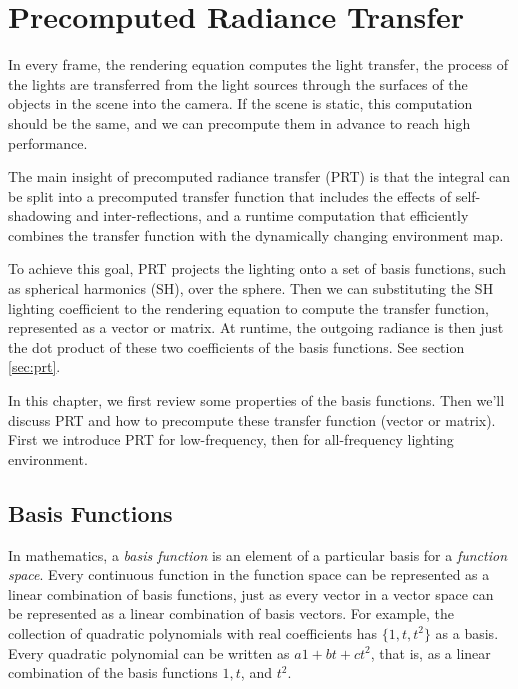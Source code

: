 \chapter{Precomputed Radiance Transfer}\label{chp:prt}
In every frame, the rendering equation computes the light transfer, the process of the lights are transferred from the light sources through the surfaces of the objects in the scene into the camera. If the scene is static, this computation should be the same, and we can precompute them in advance to reach high performance.

The main insight of precomputed radiance transfer (PRT)\cite{a:PrecomputedRadianceTransferforRealTimeRenderinginDynamicLowFrequencyLightingEnvironments} is that the integral can be split into a precomputed transfer function that includes the effects of self-shadowing and inter-reflections, and a runtime computation that efficiently combines the transfer function with the dynamically changing environment map.

To achieve this goal, PRT projects the lighting onto a set of basis functions, such as spherical harmonics (SH), over the sphere. Then we can substituting the SH lighting coefficient to the rendering equation to compute the transfer function, represented as a vector or matrix. At runtime, the outgoing radiance is then just the dot product of these two coefficients of the basis functions. See section \ref{sec:prt}.

In this chapter, we first review some properties of the basis functions. Then we'll discuss PRT and how to precompute these transfer function (vector or matrix). First we introduce PRT for low-frequency, then for all-frequency lighting environment.


\section{Basis Functions}
In mathematics, a \textit{basis function} is an element of a particular basis for a \textit{function space}. Every continuous function in the function space can be represented as a linear combination of basis functions, just as every vector in a vector space can be represented as a linear combination of basis vectors. For example, the collection of quadratic polynomials with real coefficients has $\{1,t,t^{2}\}$ as a basis. Every quadratic polynomial can be written as $a1+bt+ct^{2}$, that is, as a linear combination of the basis functions $1, t$, and $t^{2}$.

